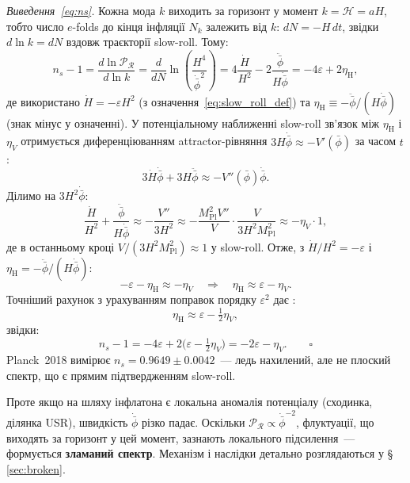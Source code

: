 \documentclass[12pt, a4paper]{article}
\begin{document}
\textit{Виведення~\eqref{eq:ns}.}
Кожна мода $k$ виходить за горизонт у момент $k = \mathcal{H}
= aH$, тобто число $e$-folds до кінця інфляції $N_k$ залежить
від $k$: $dN = -H\,dt$, звідки $d\ln k = dN$ вздовж траєкторії
slow-roll. Тому:
\begin{equation*}
  n_s - 1
    = \frac{d\ln\mathcal{P}_{\mathcal{R}}}{d\ln k}
    = \frac{d}{dN}\ln\!\left(\frac{H^4}{\dot{\bar\phi}^2}\right)
    = 4\frac{\dot H}{H^2} - 2\frac{\ddot{\bar\phi}}{H\dot{\bar\phi}}
    = -4\varepsilon + 2\eta_\mathrm{H},
\end{equation*}
де використано $\dot H = -\varepsilon H^2$ (з означення~\eqref{eq:slow_roll_def})
та $\eta_\mathrm{H} \equiv -\ddot{\bar\phi}/(H\dot{\bar\phi})$
(знак мінус у означенні).
У потенціальному наближенні slow-roll зв'язок між $\eta_\mathrm{H}$
і $\eta_V$ отримується диференціюванням attractor-рівняння
$3H\dot{\bar\phi} \approx -V'(\bar\phi)$ за часом $t$:
\begin{equation*}
  3\dot H\dot{\bar\phi} + 3H\ddot{\bar\phi} \approx -V''(\bar\phi)\dot{\bar\phi}.
\end{equation*}
Ділимо на $3H^2\dot{\bar\phi}$:
\begin{equation*}
  \frac{\dot H}{H^2} + \frac{\ddot{\bar\phi}}{H\dot{\bar\phi}}
  \approx -\frac{V''}{3H^2}
  \approx -\frac{M_\mathrm{Pl}^2 V''}{V} \cdot \frac{V}{3H^2 M_\mathrm{Pl}^2}
  \approx -\eta_V \cdot 1,
\end{equation*}
де в останньому кроці $V/(3H^2 M_\mathrm{Pl}^2) \approx 1$ у slow-roll.
Отже, з $\dot H/H^2 = -\varepsilon$ і $\eta_\mathrm{H} = -\ddot{\bar\phi}/(H\dot{\bar\phi})$:
\begin{equation*}
  -\varepsilon - \eta_\mathrm{H} \approx -\eta_V
  \quad\Rightarrow\quad
  \eta_\mathrm{H} \approx \varepsilon - \eta_V.
\end{equation*}
Точніший рахунок з урахуванням поправок порядку $\varepsilon^2$
дає \cite{mukhanov_2005}:
\[
  \eta_\mathrm{H} \approx \varepsilon - \tfrac{1}{2}\eta_V,
\]
звідки:
\begin{equation*}
  n_s - 1 = -4\varepsilon + 2\bigl(\varepsilon -
  \tfrac{1}{2}\eta_V\bigr) = -2\varepsilon - \eta_V. \qquad\square
\end{equation*}
Planck~2018 вимірює $n_s = 0.9649 \pm 0.0042$~--- ледь нахилений,
але не плоский спектр, що є прямим підтвердженням slow-roll.

Проте якщо на шляху інфлатона є локальна аномалія потенціалу
(сходинка, ділянка USR), швидкість $\dot{\bar\phi}$ різко падає.
Оскільки $\mathcal{P}_{\mathcal{R}} \propto \dot{\bar\phi}^{-2}$,
флуктуації, що виходять за горизонт у цей момент, зазнають
локального підсилення~--- формується \textbf{зламаний спектр}.
Механізм і наслідки детально розглядаються у
§\,\ref{sec:broken}.
\end{document}
